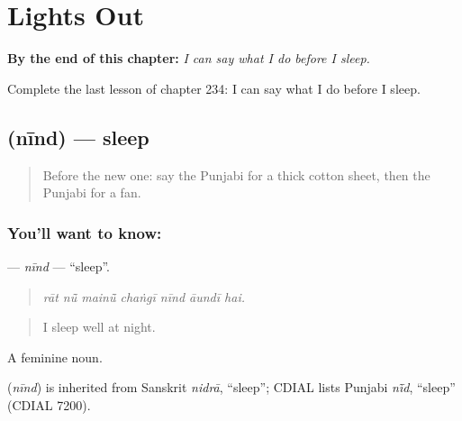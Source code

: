 
\chapter{Lights Out}
\label{ch:pa-a2-lights-out}

\begin{chapteropening}
\textbf{By the end of this chapter:} \emph{I can say what I do before I sleep.}

Complete the last lesson of chapter 234: I can say what I do before I sleep.
\end{chapteropening}

\section[\texorpdfstring{\pa{ਨੀਂਦ} (nīnd)}{ਨੀਂਦ (nīnd)}]{ (nīnd) — sleep}

\label{lesson:PA-C234-nind}



\begin{quote}
Before the new one: say the Punjabi for a thick cotton sheet, then the Punjabi for a fan.
\end{quote}

\subsection*{You'll want to know: }
\textbf{} — \emph{nīnd} — \textquotedblleft{}sleep\textquotedblright{}.

\begin{quote}
      
\end{quote}

\begin{quote}
\emph{rāt nū̃ mainū̃ chaṅgī nīnd āundī hai.}
\end{quote}

\begin{quote}
I sleep well at night.
\end{quote}

A feminine noun.

\begin{cousinweb}
\textbf{} (\emph{nīnd}) is inherited from Sanskrit \emph{nidrā}, \textquotedblleft{}sleep\textquotedblright{}; CDIAL lists Punjabi \emph{nī̃d}, \textquotedblleft{}sleep\textquotedblright{} (CDIAL 7200).
\end{cousinweb}

